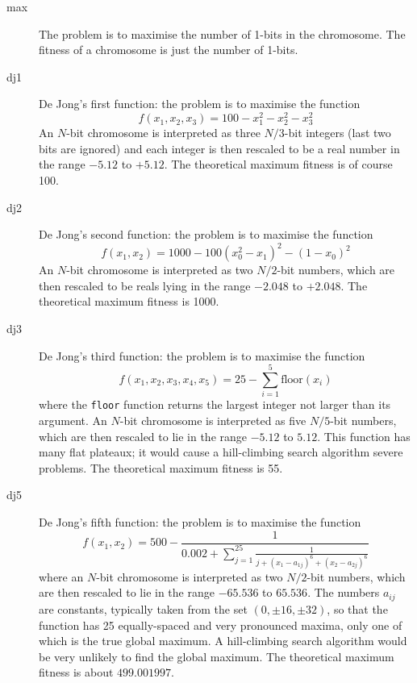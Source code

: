 \begin{description}
\item[max] The problem is to maximise the number of 1-bits in the
  chromosome. The fitness of a chromosome is just the number of
  1-bits.

\item[dj1] De Jong's first function: the problem is to maximise the
  function
\[
f(x_{1},x_{2},x_{3}) = 100 - x_{1}^{2} - x_{2}^{2} - x_{3}^{2}
\] 
  An $N$-bit chromosome is interpreted as three $N/3$-bit integers (last
  two bits are ignored) and each integer is then rescaled to be a real
  number in the range $-5.12$ to $+5.12$. The theoretical maximum
  fitness is of course 100.

\item[dj2] De Jong's second function: the problem is to maximise the
  function
\[
f(x_{1},x_{2}) = 1000 - 100(x_{0}^{2}-x_{1})^{2} - (1-x_{0})^{2}
\]
  An $N$-bit chromosome is interpreted as two $N/2$-bit numbers, which
  are then rescaled to be reals lying in the range $-2.048$ to $+2.048$.
  The theoretical maximum fitness is 1000.

\item[dj3] De Jong's third function: the problem is to maximise the
  function
\[
f(x_{1},x_{2},x_{3},x_{4},x_{5}) = 25 -  \sum_{i=1}^{5}  \mbox{floor}(x_{i})
\]
  where the \verb|floor| function returns the largest integer not larger
  than its argument. An $N$-bit chromosome is interpreted as five $N/5$-bit
  numbers, which are then rescaled to lie in the range $-5.12$ to $5.12$.
  This function has many flat plateaux; it would cause a hill-climbing
  search algorithm severe problems.
  The theoretical maximum fitness is 55.

\item[dj5] De Jong's fifth function: the problem is to maximise the
  function
\[
f(x_{1},x_{2}) = 500 - \frac{1}{0.002 + \sum_{j=1}^{25} \frac{1}{j + 
   (x_{1} - a_{1j})^{6} + (x_{2} - a_{2j})^{6}}}
\]
  where an $N$-bit chromosome is interpreted as two $N/2$-bit
  numbers, which are then rescaled to lie in the range $-65.536$ to
  $65.536$. The numbers $a_{ij}$ are constants, typically taken from the
  set $(0, {\pm}16, {\pm}32)$, so that the function has 25
  equally-spaced and very pronounced maxima, only one of which is the
  true global maximum. A hill-climbing search algorithm would be very
  unlikely to find the global maximum. The theoretical maximum fitness
  is about $499.001997$.


\end{description}
